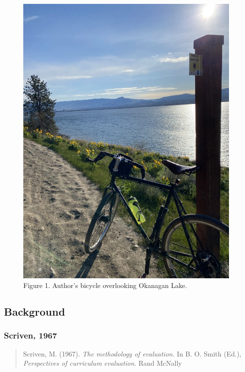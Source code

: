 \documentclass[
]{book}
\begin{document}
\begin{figure}
\centering
\includegraphics{assets/otessa22/kalamoir.jpg}
\caption{Figure 1. Author's bicycle overlooking Okanagan Lake.}
\end{figure}

\hypertarget{background}{%
\subsection*{Background}\label{background}}

\hypertarget{scriven-1967}{%
\subsubsection*{Scriven, 1967}\label{scriven-1967}}

\begin{quote}
Scriven, M. (1967). \emph{The methodology of evaluation.} In B. O. Smith (Ed.), \emph{Perspectives of curriculum evaluation}. Rand McNally
\end{quote}
\end{document}
